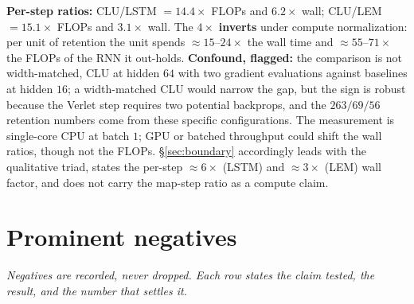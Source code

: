 \documentclass{article}
\begin{document}
\textbf{Per-step ratios:} CLU/LSTM $=14.4\times$ FLOPs and $6.2\times$ wall; CLU/LEM $=15.1\times$ FLOPs and $3.1\times$ wall. The $4\times$ \textbf{inverts} under compute normalization: per unit of retention the unit spends $\approx15$--$24\times$ the wall time and $\approx55$--$71\times$ the FLOPs of the RNN it out-holds. \textbf{Confound, flagged:} the comparison is not width-matched, CLU at hidden $64$ with two gradient evaluations against baselines at hidden $16$; a width-matched CLU would narrow the gap, but the sign is robust because the Verlet step requires two potential backprops, and the $263/69/56$ retention numbers come from these specific configurations. The measurement is single-core CPU at batch $1$; GPU or batched throughput could shift the wall ratios, though not the FLOPs. \S\ref{sec:boundary} accordingly leads with the qualitative triad, states the per-step $\approx6\times$ (LSTM) and $\approx3\times$ (LEM) wall factor, and does not carry the map-step ratio as a compute claim.

\section{Prominent negatives}\label{app:neg}

\emph{Negatives are recorded, never dropped. Each row states the claim tested, the result, and the number that settles it.}
\end{document}
